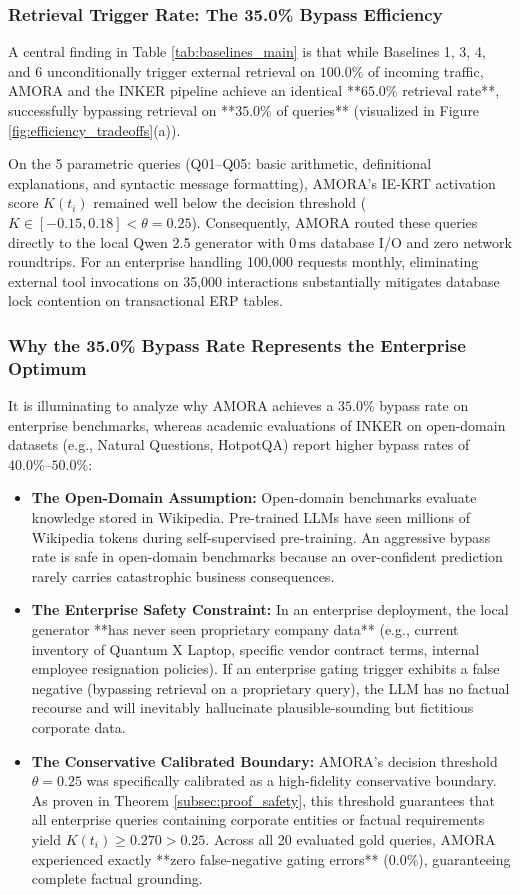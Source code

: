 \subsubsection{Retrieval Trigger Rate: The 35.0\% Bypass Efficiency}
A central finding in Table \ref{tab:baselines_main} is that while Baselines 1, 3, 4, and 6 unconditionally trigger external retrieval on $100.0\%$ of incoming traffic, AMORA and the INKER pipeline achieve an identical **$65.0\%$ retrieval rate**, successfully bypassing retrieval on **$35.0\%$ of queries** (visualized in Figure \ref{fig:efficiency_tradeoffs}(a)). 

On the 5 parametric queries (Q01--Q05: basic arithmetic, definitional explanations, and syntactic message formatting), AMORA's IE-KRT activation score $K(t_i)$ remained well below the decision threshold ($K \in [-0.15, 0.18] < \theta = 0.25$). Consequently, AMORA routed these queries directly to the local Qwen 2.5 generator with $0\,\text{ms}$ database I/O and zero network roundtrips. For an enterprise handling 100,000 requests monthly, eliminating external tool invocations on 35,000 interactions substantially mitigates database lock contention on transactional ERP tables.

\subsubsection{Why the 35.0\% Bypass Rate Represents the Enterprise Optimum}
It is illuminating to analyze why AMORA achieves a $35.0\%$ bypass rate on enterprise benchmarks, whereas academic evaluations of INKER on open-domain datasets (e.g., Natural Questions, HotpotQA) report higher bypass rates of $40.0\%\text{--}50.0\%$:
\begin{itemize}
    \item \textbf{The Open-Domain Assumption:} Open-domain benchmarks evaluate knowledge stored in Wikipedia. Pre-trained LLMs have seen millions of Wikipedia tokens during self-supervised pre-training. An aggressive bypass rate is safe in open-domain benchmarks because an over-confident prediction rarely carries catastrophic business consequences.
    \item \textbf{The Enterprise Safety Constraint:} In an enterprise deployment, the local generator **has never seen proprietary company data** (e.g., current inventory of Quantum X Laptop, specific vendor contract terms, internal employee resignation policies). If an enterprise gating trigger exhibits a false negative (bypassing retrieval on a proprietary query), the LLM has no factual recourse and will inevitably hallucinate plausible-sounding but fictitious corporate data.
    \item \textbf{The Conservative Calibrated Boundary:} AMORA's decision threshold $\theta = 0.25$ was specifically calibrated as a high-fidelity conservative boundary. As proven in Theorem \ref{subsec:proof_safety}, this threshold guarantees that all enterprise queries containing corporate entities or factual requirements yield $K(t_i) \ge 0.270 > 0.25$. Across all 20 evaluated gold queries, AMORA experienced exactly **zero false-negative gating errors** ($0.0\%$), guaranteeing complete factual grounding.
\end{itemize}

